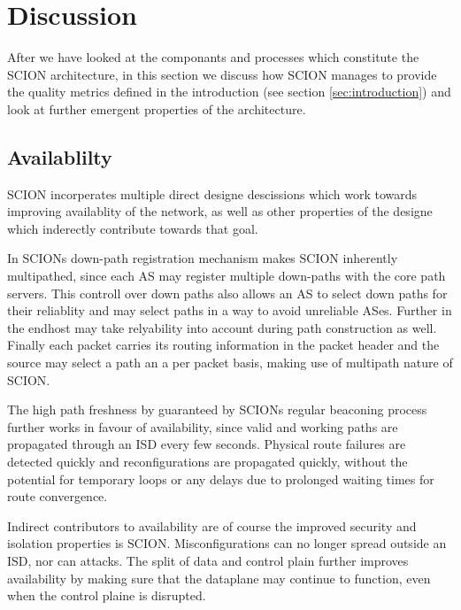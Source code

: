\documentclass[../eva1_scion.tex]{subfiles}
\begin{document}
    \section{Discussion}\label{ch:discussion}

    After we have looked at the componants and processes which constitute the SCION architecture, in this section we discuss how SCION manages to provide the quality metrics defined in the introduction (see section \ref{sec:introduction}) and look at further emergent properties of the architecture.

    \subsection{Availablilty}
    SCION incorperates multiple direct designe descissions which work towards improving availablity of the network, as well as other properties of the designe which inderectly contribute towards that goal.

    In SCIONs down-path registration mechanism makes SCION inherently multipathed, since each AS may register multiple down-paths with the core path servers. This controll over down paths also allows an AS to select down paths for their reliablity and may select paths in a way to avoid unreliable ASes. Further in the endhost may take relyability into account during path construction as well. Finally each packet carries its routing information in the packet header and the source may select a path an a per packet basis, making use of multipath nature of SCION.

    The high path freshness by guaranteed by SCIONs regular beaconing process further works in favour of availability, since valid and working paths are propagated through an ISD every few seconds. Physical route failures are detected quickly and reconfigurations are propagated quickly, without the potential for temporary loops or any delays due to prolonged waiting times for route convergence.

    Indirect contributors to availability are of course the improved security and isolation properties is SCION. Misconfigurations can no longer spread outside an ISD, nor can attacks. The split of data and control plain further improves availability by making sure that the dataplane may continue to function, even when the control plaine is disrupted.
    
\end{document}
